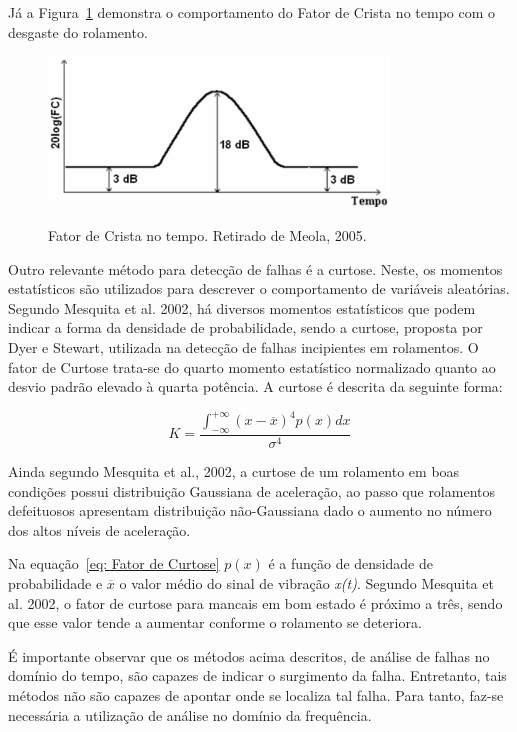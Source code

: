 \documentclass[
	12pt,				
	oneside,			
	a4paper,			
	english,			
	brazil,			
	]{abntex2ppgsi}
\begin{document}
Já a Figura~\ref{FatorCrista} demonstra o comportamento do Fator de Crista no tempo com o desgaste do rolamento.

\begin{figure}[!htb]
\centering
\caption {Fator de Crista no tempo. Retirado de Meola, 2005.}
\includegraphics[width=\textwidth,height=40mm,keepaspectratio]{Figura19}
\label{FatorCrista}
\end{figure}	

Outro relevante método para detecção de falhas é a curtose. Neste, os momentos estatísticos são utilizados para descrever o comportamento de variáveis aleatórias. Segundo Mesquita et al. 2002, há diversos momentos estatísticos que podem indicar a forma da densidade de probabilidade, sendo a curtose, proposta por Dyer e Stewart, utilizada na detecção de falhas incipientes em rolamentos. O fator de Curtose trata-se do quarto momento estatístico normalizado quanto ao desvio padrão elevado à quarta potência. A curtose é descrita da seguinte forma:

\begin{equation}
	K = \frac{ \int_{-\infty}^{+\infty} (x - \overline{x})^{4}p(x)dx } {\sigma^{4}}
	\label{eq: Fator de Curtose}
\end{equation}

Ainda segundo Mesquita et al., 2002, a curtose de um rolamento em boas condições possui distribuição Gaussiana de aceleração, ao passo que rolamentos defeituosos apresentam distribuição não-Gaussiana dado o aumento no número dos altos níveis de aceleração. 

Na equação~\ref{eq: Fator de Curtose} $p(x)$ é a função de densidade de probabilidade e $\overline{x}$ o valor médio do sinal de vibração \textit{x(t)}. Segundo Mesquita et al. 2002, o fator de curtose para mancais em bom estado é próximo a três, sendo que esse valor tende a aumentar conforme o rolamento se deteriora. 

É importante observar que os métodos acima descritos, de análise de falhas no domínio do tempo, são capazes de indicar o surgimento da falha. Entretanto, tais métodos não são capazes de apontar onde se localiza tal falha. Para tanto, faz-se necessária a utilização de análise no domínio da frequência. 
\end{document}
